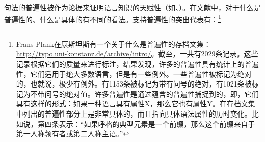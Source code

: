 句法的普遍性被作为论据来证明语言知识的天赋性（如\citealp[]{Chomsky98a-u}、\citealp[--238]{Pinker94a}）。在文献中，对于什么是普遍性的、什么是具体的有不同的看法。支持普遍性的突出代表有：\footnote{%
Frans Plank在康斯坦斯有一个关于什么是普遍性的存档文集\citep{PF2000a}：\url{http://typo.uni-konstanz.de/archive/intro/}。截至，一共有2029条记录。这些记录根据它们的质量来进行标注，结果发现，许多的普遍性具有统计上的普遍性，它们适用于绝大多数语言，但是有一些例外。一些普遍性被标记为绝对的，也就说，极少有例外。有1153条被标记为带有问号的绝对，有1021条被标记为不带问号的绝对值。许多普遍性是通过蕴含的普遍性捕捉到的，即，它们具有这样的形式：如果一种语言具有属性X，那么它也有属性Y。在存档文集中列出的普遍性部分上是非常具体的，而且指向具体语法属性的历时变化。比如说，第四条表示：“如果呼格的典型元素是一个前缀，那么这个前缀来自于第一人称领有者或第二人称主语。”
}\nocite{Harbour2011a}


